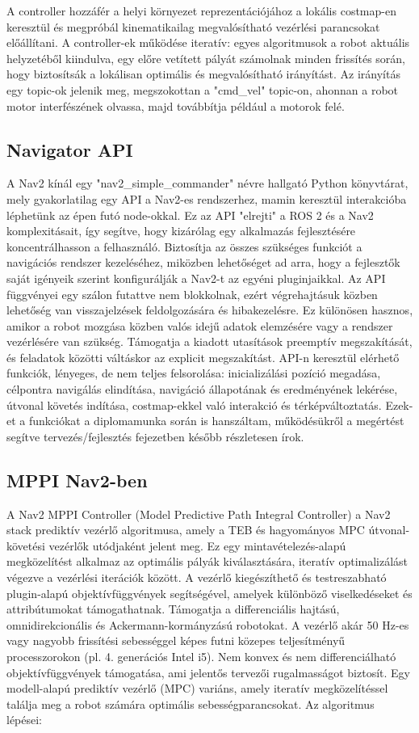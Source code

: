 A controller hozzáfér a helyi környezet reprezentációjához a lokális costmap-en keresztül és megpróbál kinematikailag megvalósítható vezérlési parancsokat előállítani. A controller-ek működése iteratív: egyes algoritmusok a robot aktuális helyzetéből kiindulva, egy előre vetített pályát számolnak minden frissítés során, hogy biztosítsák a lokálisan optimális és megvalósítható irányítást. Az irányítás egy topic-ok jelenik meg, megszokottan a "cmd\_vel" topic-on, ahonnan a robot motor interfészének olvassa, majd továbbítja például a motorok felé. \cite{nav2}

\subsection{Navigator API}
A Nav2 kínál egy "nav2\_simple\_commander" névre hallgató Python könyvtárat, mely gyakorlatilag egy API a Nav2-es rendszerhez, mamin keresztül interakcióba léphetünk az épen futó node-okkal. Ez az API "elrejti" a ROS 2 és a Nav2 komplexitásait, így segítve, hogy kizárólag egy alkalmazás fejlesztésére koncentrálhasson a felhasználó. Biztosítja az összes szükséges funkciót a navigációs rendszer kezeléséhez, miközben lehetőséget ad arra, hogy a fejlesztők saját igényeik szerint konfigurálják a Nav2-t az egyéni pluginjaikkal. Az API függvényei egy szálon futattve nem blokkolnak, ezért végrehajtásuk közben lehetőség van visszajelzések feldolgozására és hibakezelésre. Ez különösen hasznos, amikor a robot mozgása közben valós idejű adatok elemzésére vagy a rendszer vezérlésére van szükség. Támogatja a kiadott utasítások preemptív megszakítását, és feladatok közötti váltáskor az explicit megszakítást. API-n keresztül elérhető funkciók, lényeges, de nem teljes felsorolása: inicializálási pozíció megadása, célpontra navigálás elindítása, navigáció állapotának és eredményének lekérése, útvonal követés indítása, costmap-ekkel való interakció és térképváltoztatás. Ezek-et a funkciókat a diplomamunka során is hanszáltam, működésükről a megértést segítve tervezés/fejlesztés fejezetben később részletesen írok. \cite{nav2}

\subsection{MPPI Nav2-ben}
A Nav2 MPPI Controller (Model Predictive Path Integral Controller) a Nav2 stack prediktív vezérlő algoritmusa, amely a TEB és hagyományos MPC útvonal-követési vezérlők utódjaként jelent meg. Ez egy mintavételezés-alapú megközelítést alkalmaz az optimális pályák kiválasztására, iteratív optimalizálást végezve a vezérlési iterációk között. A vezérlő kiegészíthető és testreszabható plugin-alapú objektívfüggvények segítségével, amelyek különböző viselkedéseket és attribútumokat támogathatnak. Támogatja a differenciális hajtású, omnidirekcionális és Ackermann-kormányzású robotokat. A vezérlő akár 50 Hz-es vagy nagyobb frissítési sebességgel képes futni közepes teljesítményű processzorokon (pl. 4. generációs Intel i5). Nem konvex és nem differenciálható objektívfüggvények támogatása, ami jelentős tervezői rugalmasságot biztosít. Egy modell-alapú prediktív vezérlő (MPC) variáns, amely iteratív megközelítéssel találja meg a robot számára optimális sebességparancsokat. Az algoritmus lépései:

